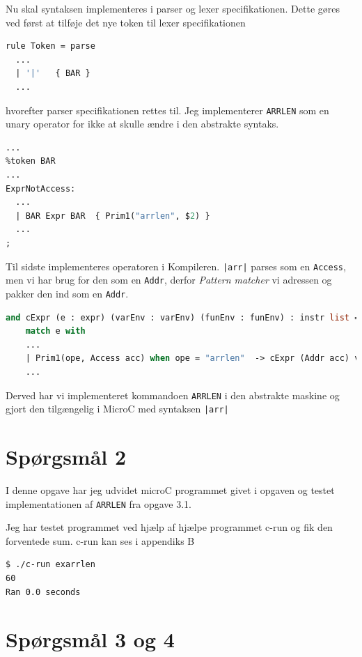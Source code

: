 \documentclass[danish,a4paper]{report}
\begin{document}
Nu skal syntaksen implementeres i parser og lexer specifikationen. Dette gøres ved først at tilføje det nye token til lexer specifikationen

\begin{lstlisting}[language=ML]
rule Token = parse
  ...
  | '|'   { BAR }
  ...
\end{lstlisting}

hvorefter parser specifikationen rettes til. Jeg implementerer \texttt{ARRLEN} som en unary operator for ikke at skulle ændre i den abstrakte syntaks.

\begin{lstlisting}[language=ML]
...
%token BAR
...
ExprNotAccess:
  ...
  | BAR Expr BAR  { Prim1("arrlen", $2) }
  ...
;
\end{lstlisting}

Til sidste implementeres operatoren i Kompileren. \texttt{|arr|} parses som en \texttt{Access}, men vi har brug for den som en \texttt{Addr}, derfor \textit{Pattern matcher} vi adressen og pakker den ind som en \texttt{Addr}.

\begin{lstlisting}[language=ML]
and cExpr (e : expr) (varEnv : varEnv) (funEnv : funEnv) : instr list = 
    match e with
    ...
    | Prim1(ope, Access acc) when ope = "arrlen"  -> cExpr (Addr acc) varEnv funEnv @ [ARRLEN]
    ...
\end{lstlisting}

Derved har vi implementeret kommandoen \texttt{ARRLEN} i den abstrakte maskine og gjort den tilgængelig i MicroC med syntaksen \texttt{|arr|}

\section*{Spørgsmål 2}

I denne opgave har jeg udvidet microC programmet givet i opgaven og testet implementationen af \texttt{ARRLEN} fra opgave 3.1.



Jeg har testet programmet ved hjælp af hjælpe programmet c-run og fik den forventede sum. c-run kan ses i appendiks B

\begin{lstlisting}[language=bash]
$ ./c-run exarrlen
60
Ran 0.0 seconds
\end{lstlisting}

\section*{Spørgsmål 3 og 4}
\end{document}
